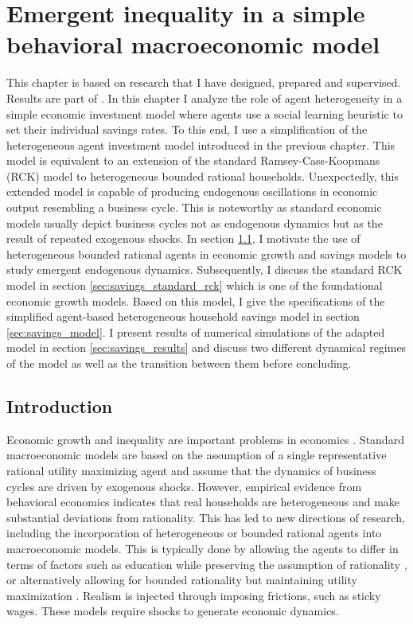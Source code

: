 \chapter{Emergent inequality in a simple behavioral macroeconomic model}
\label{chapter:savings}

This chapter is based on research that I have designed, prepared and supervised. Results are part of \citep[P4]{Asano2019}. In this chapter I analyze the role of agent heterogeneity in a simple economic investment model where agents use a social learning heuristic to set their individual savings rates. To this end, I use a simplification of the heterogeneous agent investment model introduced in the previous chapter. This model is equivalent to an extension of the standard Ramsey-Cass-Koopmans (RCK) model to heterogeneous bounded rational households. Unexpectedly, this extended model is capable of producing endogenous oscillations in economic output resembling a business cycle. This is noteworthy as standard economic models usually depict business cycles not as endogenous dynamics but as the result of repeated exogenous shocks. In section \ref{sec:savings_introduction}, I motivate the use of heterogeneous bounded rational agents in economic growth and savings models to study emergent endogenous dynamics. Subsequently, I discuss the standard RCK model in section \ref{sec:savings_standard_rck} which is one of the foundational economic growth models. Based on this model, I give the specifications of the simplified agent-based heterogeneous household savings model in section \ref{sec:savings_model}. I present results of numerical simulations of the adapted model in section \ref{sec:savings_results} and discuss two different dynamical regimes of the model as well as the transition between them before concluding.

\section{Introduction}
\label{sec:savings_introduction}
Economic growth and inequality are important problems in economics \citep{Acemoglu2009, piketty2015capital}. Standard macroeconomic models are based on the assumption of a single representative rational utility maximizing agent and assume that the dynamics of business cycles are driven by exogenous shocks. However, empirical evidence from behavioral economics indicates that real households are heterogeneous and make substantial deviations from rationality.   This has led to new directions of research, including the incorporation of heterogeneous or bounded rational agents into macroeconomic models. This is typically done by allowing the agents to differ in terms of factors such as education while preserving the assumption of rationality \citep{ hank_reviewLeahy2018, hank_branch2009new, hank_zhao2018many}, or alternatively allowing for bounded rationality but maintaining utility maximization \citep{hank_gabaix2016behavioral}.  Realism is injected through imposing frictions, such as sticky wages.  These models require shocks to generate economic dynamics.

